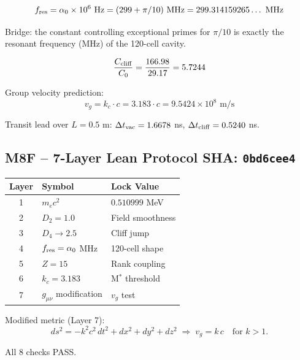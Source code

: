 \documentclass[12pt,letterpaper]{article}
\begin{document}
\begin{equation}
  f_{\rm res} = \alpha_0 \times 10^6 \text{ Hz}
  = (299 + \pi/10) \text{ MHz}
  = 299.314159265\ldots \text{ MHz}
  \label{eq:fres}
\end{equation}

Bridge: the constant controlling exceptional primes for $\pi/10$
is exactly the resonant frequency (MHz) of the 120-cell cavity.

\begin{equation}
  \frac{C_{\rm cliff}}{C_0} = \frac{166.98}{29.17} = 5.7244
  \label{eq:Cjump}
\end{equation}

Group velocity prediction:
\begin{equation}
  v_g = k_c \cdot c = 3.183 \cdot c = 9.5424 \times 10^8 \text{ m/s}
  \label{eq:vg}
\end{equation}

Transit lead over $L = 0.5$ m:
$\Delta t_{\rm vac} = 1.6678$ ns, $\Delta t_{\rm cliff} = 0.5240$ ns.

\subsection{M8F -- 7-Layer Lean Protocol \hfill SHA: \texttt{0bd6cee4}}

\begin{center}
\begin{tabular}{cll}
\toprule
Layer & Symbol & Lock Value \\
\midrule
1 & $m_e c^2$ & $0.510999$ MeV \\
2 & $D_2 = 1.0$ & Field smoothness \\
3 & $D_4 \to 2.5$ & Cliff jump \\
4 & $f_{\rm res} = \alpha_0$ MHz & 120-cell shape \\
5 & $Z = 15$ & Rank coupling \\
6 & $k_c = 3.183$ & M$^*$ threshold \\
7 & $g_{\mu\nu}$ modification & $v_g$ test \\
\bottomrule
\end{tabular}
\end{center}

Modified metric (Layer 7):
\begin{equation}
  ds^2 = -k^2 c^2\,dt^2 + dx^2 + dy^2 + dz^2
  \;\Rightarrow\; v_g = k\,c \quad\text{for }k > 1.
  \label{eq:metric}
\end{equation}

All 8 checks PASS.
\end{document}

